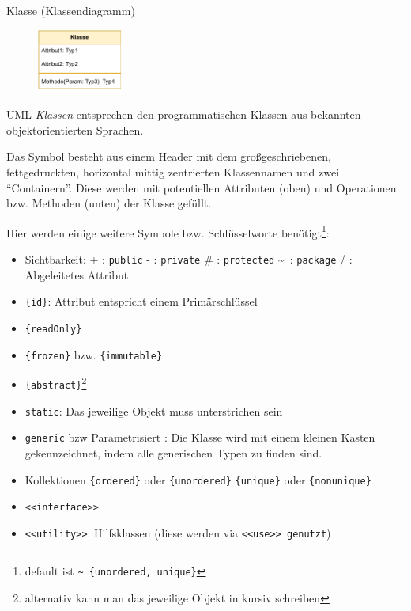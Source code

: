 \begin{diag}{Klasse (Klassendiagramm)}
    \begin{figure}
        \centering
        \includegraphics[width=0.25\textwidth]{includes/figures/defi_diagrams_class_intro.pdf}
    \end{figure}
    UML \emph{Klassen} entsprechen den programmatischen Klassen aus bekannten objektorientierten Sprachen.

    Das Symbol besteht aus einem Header mit dem großgeschriebenen, fettgedruckten, horizontal mittig zentrierten Klassennamen und zwei \enquote{Containern}.
    Diese werden mit potentiellen Attributen (oben) und Operationen bzw. Methoden (unten) der Klasse gefüllt.

    Hier werden einige weitere Symbole bzw. Schlüsselworte benötigt\footnote{default ist \texttt{\textasciitilde \ \{unordered, unique\}}}:
    \begin{itemize}
        \item Sichtbarkeit:
              \subitem + : \texttt{public}
              \subitem - : \texttt{private}
              \subitem \# : \texttt{protected}
              \subitem \textasciitilde\ : \texttt{package}
              \subitem / : Abgeleitetes Attribut
        \item \texttt{\{id\}}: Attribut entspricht einem Primärschlüssel
        \item \texttt{\{readOnly\}}
        \item \texttt{\{frozen\}} bzw. \texttt{\{immutable\}}
        \item \texttt{\{abstract\}}\footnote{alternativ kann man das jeweilige Objekt in kursiv schreiben}
        \item \texttt{static}: Das jeweilige Objekt muss unterstrichen sein
        \item \texttt{generic} bzw Parametrisiert : Die Klasse wird mit einem kleinen Kasten gekennzeichnet, indem alle generischen Typen zu finden sind.
        \item Kollektionen
              \subitem \texttt{\{ordered\}} oder \texttt{\{unordered\}}
              \subitem \texttt{\{unique\}} oder \texttt{\{nonunique\}}
        \item \texttt{<<interface>>}
        \item \texttt{<<utility>>}: Hilfsklassen (diese werden via \texttt{<<use>> genutzt})
    \end{itemize}
\end{diag}

